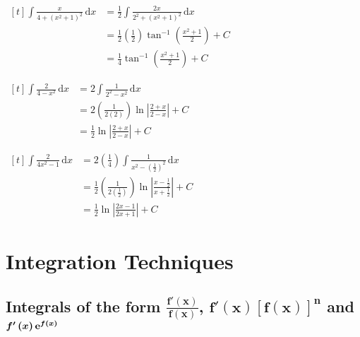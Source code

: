 \documentclass[11pt,a4paper]{book}
\begin{document}
\begin{example}
\begin{tasks}[label=(\alph*),label-width=3.5ex,after-item-skip = .3cm]
\task
$
\begin{aligned}[t]
{\displaystyle \int\frac{x}{4+(x^{2}+1)^{2}}\, \mathrm{d}x} & ={\displaystyle \frac{1}{2}\int\frac{2x}{2^{2}+(x^{2}+1)^{2}}\, \mathrm{d}x}\\
 & =\frac{1}{2}\left(\frac{1}{2}\right)\tan^{-1}\left(\frac{x^{2}+1}{2}\right)+C\\
 & =\frac{1}{4}\tan^{-1}\left(\frac{x^{2}+1}{2}\right)+C
\end{aligned}
$

\task
$
\begin{aligned}[t]
{\displaystyle \int\frac{2}{4-x^{2}}\, \mathrm{d}x} & ={\displaystyle {\displaystyle 2\int\frac{1}{2^{2}-x^{2}}\, \mathrm{d}x}}\\
 & =2\left(\frac{1}{2(2)}\right)\ln\left|\frac{2+x}{2-x}\right|+C\\
 & =\frac{1}{2}\ln\left|\frac{2+x}{2-x}\right|+C
\end{aligned}
$

\task
$
\begin{aligned}[t]
{\displaystyle \int\frac{2}{4x^{2}-1}\, \mathrm{d}x} & ={\displaystyle {\displaystyle {\displaystyle 2\left(\frac{1}{4}\right)\int\frac{1}{x^{2}-\left(\frac{1}{2}\right)^{2}}\, \mathrm{d}x}}}\\
 & =\frac{1}{2}\left(\frac{1}{2(\frac{1}{2})}\right)\ln\left|\frac{x-\frac{1}{2}}{x+\frac{1}{2}}\right|+C\\
 & =\frac{1}{2}\ln\left|\frac{2x-1}{2x+1}\right|+C
\end{aligned}
$

\end{tasks}

\end{example}


\newpage{}

\section{Integration Techniques}

\subsection{Integrals of the form ${\displaystyle \boldsymbol{\frac{f'\left(x\right)}{f\left(x\right)}}}$,
$\boldsymbol{f'\left(x\right)\left[f\left(x\right)\right]^{n}}$ and
$\boldsymbol{f'\left(x\right){\rm e}^{f\left(x\right)}}$}
\end{document}
